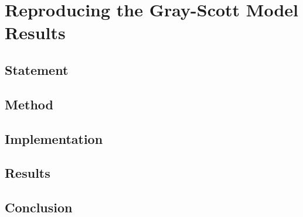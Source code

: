 \section{Reproducing the Gray-Scott Model Results}

\subsection{Statement}
\subsection{Method}
\subsection{Implementation}
\subsection{Results}
\subsection{Conclusion}
